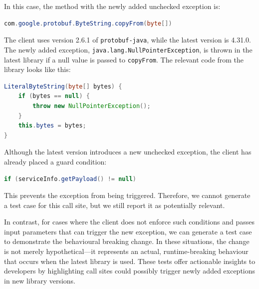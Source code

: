 In this case, the method with the newly added unchecked exception is:

\begin{lstlisting}[language=Java, basicstyle=\scriptsize\ttfamily]
com.google.protobuf.ByteString.copyFrom(byte[])
\end{lstlisting}

The client uses version 2.6.1 of \texttt{protobuf-java}, while the latest version is 4.31.0. The newly added exception, \texttt{java.lang.NullPointerException}, is thrown in the latest library if a null value is passed to \texttt{copyFrom}. The relevant code from the library looks like this:

\begin{lstlisting}[language=Java, basicstyle=\scriptsize\ttfamily]
LiteralByteString(byte[] bytes) {
    if (bytes == null) {
        throw new NullPointerException();
    }
    this.bytes = bytes;
}
\end{lstlisting}

Although the latest version introduces a new unchecked exception, the client has already placed a guard condition:

\begin{lstlisting}[language=Java, basicstyle=\scriptsize\ttfamily]
if (serviceInfo.getPayload() != null)
\end{lstlisting}

This prevents the exception from being triggered. Therefore, we cannot generate a test case for this call site, but we still report it as potentially relevant.

In contrast, for cases where the client does not enforce such conditions and passes input parameters that can trigger the new exception, we can generate a test case to demonstrate the behavioural breaking change. In these situations, the change is not merely hypothetical—it represents an actual, runtime-breaking behaviour that occurs when the latest library is used. These tests offer actionable insights to developers by highlighting call sites could possibly trigger newly added exceptions in new library versions.


